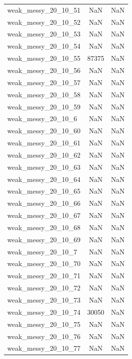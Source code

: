 \begin{longtable}{lcc}
weak\_messy\_20\_10\_51    &      NaN &    NaN \\
weak\_messy\_20\_10\_52    &      NaN &    NaN \\
weak\_messy\_20\_10\_53    &      NaN &    NaN \\
weak\_messy\_20\_10\_54    &      NaN &    NaN \\
weak\_messy\_20\_10\_55    &    87375 &    NaN \\
weak\_messy\_20\_10\_56    &      NaN &    NaN \\
weak\_messy\_20\_10\_57    &      NaN &    NaN \\
weak\_messy\_20\_10\_58    &      NaN &    NaN \\
weak\_messy\_20\_10\_59    &      NaN &    NaN \\
weak\_messy\_20\_10\_6     &      NaN &    NaN \\
weak\_messy\_20\_10\_60    &      NaN &    NaN \\
weak\_messy\_20\_10\_61    &      NaN &    NaN \\
weak\_messy\_20\_10\_62    &      NaN &    NaN \\
weak\_messy\_20\_10\_63    &      NaN &    NaN \\
weak\_messy\_20\_10\_64    &      NaN &    NaN \\
weak\_messy\_20\_10\_65    &      NaN &    NaN \\
weak\_messy\_20\_10\_66    &      NaN &    NaN \\
weak\_messy\_20\_10\_67    &      NaN &    NaN \\
weak\_messy\_20\_10\_68    &      NaN &    NaN \\
weak\_messy\_20\_10\_69    &      NaN &    NaN \\
weak\_messy\_20\_10\_7     &      NaN &    NaN \\
weak\_messy\_20\_10\_70    &      NaN &    NaN \\
weak\_messy\_20\_10\_71    &      NaN &    NaN \\
weak\_messy\_20\_10\_72    &      NaN &    NaN \\
weak\_messy\_20\_10\_73    &      NaN &    NaN \\
weak\_messy\_20\_10\_74    &    30050 &    NaN \\
weak\_messy\_20\_10\_75    &      NaN &    NaN \\
weak\_messy\_20\_10\_76    &      NaN &    NaN \\
weak\_messy\_20\_10\_77    &      NaN &    NaN \\

\end{longtable}
